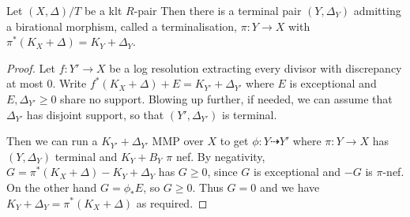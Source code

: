 \begin{lemma}\label{term-mod}
	
	Let $(X,\Delta)/T$ be a klt $R$-pair Then there is a terminal pair $(Y,\Delta_{Y})$ admitting a birational morphism, called a terminalisation, $\pi\colon Y \to X$ with $\pi^{*}(K_{X}+\Delta)=K_{Y}+\Delta_{Y}$.
	
\end{lemma}

\begin{proof}
	
	Let $f \colon Y' \to X$ be a log resolution extracting every divisor with discrepancy at most $0$. Write $f^{*}(K_{X}+\Delta)+E=K_{Y'}+\Delta_{Y'}$ where $E$ is exceptional and $E, \Delta_{Y'} \geq 0$ share no support. Blowing up further, if needed, we can assume that $\Delta_{Y'}$ has disjoint support, so that $(Y',\Delta_{Y'})$ is terminal.
	
	Then we can run a $K_{Y'}+\Delta_{Y'}$ MMP over $X$ to get $\phi \colon Y \dashrightarrow Y'$ where $\pi \colon Y \to X$ has $(Y,\Delta_{Y})$ terminal and $K_{Y}+B_{Y}$ $\pi$ nef. By negativity, $G=\pi^{*}(K_{X}+\Delta)-K_{Y}+\Delta_{Y}$ has $G \geq 0$, since $G$ is exceptional and $-G$ is $\pi$-nef. On the other hand $G=\phi_{*}E$, so $G \geq 0$. Thus $G=0$ and we have $K_{Y}+\Delta_{Y}=\pi^{*}(K_{X}+\Delta)$ as required.
	

\end{proof}

%	
%	

%	
%	

